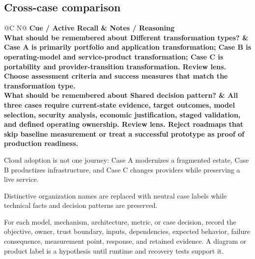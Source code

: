 \documentclass[11pt]{article}
\newcommand{\CornellHeader}{\rowcolor{Navy}\color{white}\bfseries Cue / Active Recall & \color{white}\bfseries Notes / Reasoning \\\endhead}
\newcommand{\CornellRow}[2]{\cellcolor{CueGray}\textbf{#1} & #2 \\\addlinespace[3pt]}
\begin{document}
\subsection{Cross-case comparison}
\begin{longtable}{@{}C N@{}}
\CornellHeader
\CornellRow{What should be remembered about Different transformation types?}{Case A is primarily portfolio and application transformation; Case B is operating-model and service-product transformation; Case C is portability and provider-transition transformation. \textbf{Review lens.} Choose assessment criteria and success measures that match the transformation type.}
\CornellRow{What should be remembered about Shared decision pattern?}{All three cases require current-state evidence, target outcomes, model selection, security analysis, economic justification, staged validation, and defined operating ownership. \textbf{Review lens.} Reject roadmaps that skip baseline measurement or treat a successful prototype as proof of production readiness.}
\end{longtable}
\begin{sectionsummarybox}
Cloud adoption is not one journey: Case A modernizes a fragmented estate, Case B productizes infrastructure, and Case C changes providers while preserving a live service.
\end{sectionsummarybox}
\begin{scopenotebox}
Distinctive organization names are replaced with neutral case labels while technical facts and decision patterns are preserved.
\end{scopenotebox}
\begin{practicebox}
For each model, mechanism, architecture, metric, or case decision, record the objective, owner, trust boundary, inputs, dependencies, expected behavior, failure consequence, measurement point, response, and retained evidence. A diagram or product label is a hypothesis until runtime and recovery tests support it.
\end{practicebox}
\end{document}
